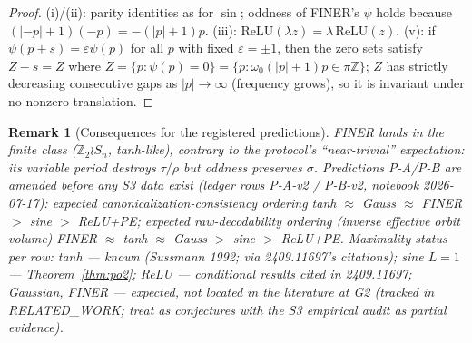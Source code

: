 \documentclass[11pt]{article}
\newtheorem{remark}[theorem]{Remark}
\newcommand{\Z}{\mathbb{Z}}
\begin{document}
\begin{proof}
(i)/(ii): parity identities as for $\sin$; oddness of FINER's $\psi$ holds because
$(|-p|+1)(-p)=-(|p|+1)p$. (iii): $\mathrm{ReLU}(\lambda z)=\lambda\,\mathrm{ReLU}(z)$.
(v): if $\psi(p+s)=\varepsilon\psi(p)$ for all $p$ with fixed $\varepsilon=\pm1$, then the zero
sets satisfy $Z-s=Z$ where $Z=\{p:\psi(p)=0\}=\{p:\omega_0(|p|+1)p\in\pi\Z\}$; $Z$ has strictly
decreasing consecutive gaps as $|p|\to\infty$ (frequency grows), so it is invariant under no
nonzero translation.
\end{proof}

\begin{remark}[Consequences for the registered predictions]
FINER lands in the \emph{finite} class ($\Z_2\wr S_n$, tanh-like), contrary to the protocol's
``near-trivial'' expectation: its variable period destroys $\tau/\rho$ but oddness preserves
$\sigma$. Predictions P-A/P-B are amended \emph{before} any S3 data exist (ledger rows P-A-v2 /
P-B-v2, notebook 2026-07-17): expected canonicalization-consistency ordering
tanh $\approx$ Gauss $\approx$ FINER $>$ sine $>$ ReLU+PE; expected raw-decodability ordering
(inverse effective orbit volume) FINER $\approx$ tanh $\approx$ Gauss $>$ sine $>$ ReLU+PE.
Maximality status per row: tanh — known (Sussmann 1992; via 2409.11697's citations);
sine $L=1$ — Theorem~\ref{thm:po2}; ReLU — conditional results cited in 2409.11697;
Gaussian, FINER — expected, not located in the literature at G2 (tracked in RELATED\_WORK; treat
as conjectures with the S3 empirical audit as partial evidence).
\end{remark}
\end{document}
